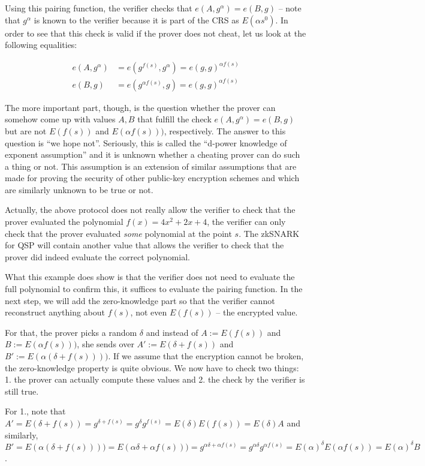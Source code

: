 \documentclass[11pt,letterpaper]{article}
\begin{document}
Using this pairing function, the verifier checks that $e(A, g^{\alpha }) = e(B, g)$ -- note that $g^{\alpha }$ is known to the verifier because it is part of the CRS as $E(\alpha s^{0})$. In order to see that this check is valid if the prover does not cheat, let us look at the following equalities:

\begin{align*}
e(A, g^{\alpha }) &= e(g^{f(s)}, g^{\alpha }) = e(g, g)^{\alpha  f(s)} \\
e(B, g) &= e(g^{\alpha  f(s)}, g) = e(g, g)^{\alpha  f(s)}
\end{align*}

The more important part, though, is the question whether the prover can somehow come up with values $A, B$ that fulfill the check $e(A, g^{\alpha }) = e(B, g)$ but are not $E(f(s))$ and $E(\alpha  f(s)))$, respectively. The answer to this question is ``we hope not''. Seriously, this is called the ``d-power knowledge of exponent assumption'' and it is unknown whether a cheating prover can do such a thing or not. This assumption is an extension of similar assumptions that are made for proving the security of other public-key encryption schemes and which are similarly unknown to be true or not.


Actually, the above protocol does not really allow the verifier to check that the prover evaluated the polynomial $f(x) = 4x^{2} + 2x + 4$, the verifier can only check that the prover evaluated \textit{some} polynomial at the point $s$. The zkSNARK for QSP will contain another value that allows the verifier to check that the prover did indeed evaluate the correct polynomial.


What this example does show is that the verifier does not need to evaluate the full polynomial to confirm this, it suffices to evaluate the pairing function. In the next step, we will add the zero-knowledge part so that the verifier cannot reconstruct anything about $f(s)$, not even $E(f(s))$ -- the encrypted value.


For that, the prover picks a random $\delta$  and instead of $A := E(f(s))$ and $B := E(\alpha  f(s)))$, she sends over $A' := E(\delta  + f(s))$ and $B' := E(\alpha  (\delta  + f(s))))$. If we assume that the encryption cannot be broken, the zero-knowledge property is quite obvious. We now have to check two things: 1. the prover can actually compute these values and 2. the check by the verifier is still true.


For 1., note that $A' = E(\delta  + f(s)) = g^{\delta  + f(s)} = g^{\delta }g^{f(s)} = E(\delta ) E(f(s)) = E(\delta ) A$ and similarly, $B' = E(\alpha  (\delta  + f(s)))) = E(\alpha  \delta  + \alpha  f(s))) = g^{\alpha  \delta  + \alpha  f(s)} = g^{\alpha  \delta } g^{\alpha  f(s)} = E(\alpha )^{\delta }E(\alpha  f(s)) = E(\alpha )^{\delta } B$.
\end{document}
